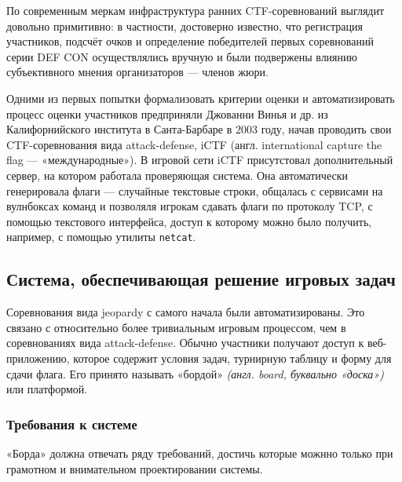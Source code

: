 По современным меркам инфраструктура ранних CTF-соревнований выглядит довольно примитивно: в частности, достоверно известно, что регистрация участников, подсчёт очков и определение победителей первых соревнований серии DEF CON осуществлялись вручную и были подвержены влиянию субъективного мнения организаторов --- членов жюри.

Одними из первых попытки формализовать критерии оценки и автоматизировать процесс оценки участников предприняли Джованни Винья и др. из Калифорнийского института в Санта-Барбаре в 2003 году\cite{vigna2014:ictf}, начав проводить свои CTF-соревнования вида attack-defense, iCTF (англ. international capture the flag — «международные»). В игровой сети iCTF присутстовал дополнительный сервер, на котором работала проверяющая система. Она автоматически генерировала флаги --- случайные текстовые строки, общалась с сервисами на вулнбоксах команд и позволяля игрокам сдавать флаги по протоколу TCP, с помощью текстового интерфейса, доступ к которому можно было получить, например, с помощью утилиты \texttt{netcat}.


\subsection{Система, обеспечивающая решение игровых задач}

Соревнования вида jeopardy с самого начала были автоматизированы. Это связано с относительно более тривиальным игровым процессом, чем в соревнованиях вида attack-defense. Обычно участники получают доступ к веб-приложению, которое содержит условия задач, турнирную таблицу и форму для сдачи флага. Его принято называть «бордой» \textit{(англ. board, буквально «доска»)} или платформой.

\subsubsection{Требования к системе}

«Борда» должна отвечать ряду требований, достичь которые можнно только при грамотном и внимательном проектировании системы.

